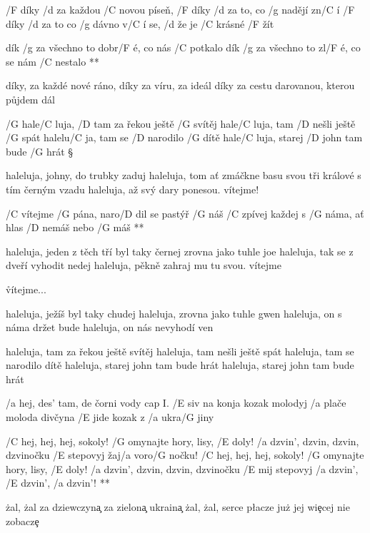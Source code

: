 /F díky /d za každou /C novou píseň, /F díky /d za to, co /g nadějí zn/C í
/F díky /d za to co /g dávno v/C í se, /d že je /C krásné /F žít

\R dík /g za všechno to dobr/F é, co nás /C potkalo
   dík /g za všechno to zl/F é, co se nám /C nestalo **

díky, za každé nové ráno, díky za víru, za ideál
díky za cestu darovanou, kterou půjdem dál





/G hale/C luja, /D tam za řekou ještě /G svítěj
hale/C luja, tam /D nešli ještě /G spát
halelu/C ja, tam se /D narodilo /G dítě
hale/C luja, starej /D john tam bude /G hrát \S

haleluja, johny, do trubky zaduj
haleluja, tom ať zmáčkne basu svou
tři králové s tím černým vzadu
haleluja, až svý dary ponesou. vítejme!

\R  /C vítejme /G pána, naro/D dil se pastýř /G náš
    /C zpívej každej s /G náma, ať hlas /D nemáš nebo /G máš **

haleluja, jeden z těch tří byl taky černej
zrovna jako tuhle joe
haleluja, tak se z dveří vyhodit nedej
haleluja, pěkně zahraj mu tu svou. vítejme

\r vítejme...

haleluja, ježíš byl taky chudej
haleluja, zrovna jako tuhle gwen
haleluja, on s náma držet bude
haleluja, on nás nevyhodí ven

\rr

\rr

haleluja, tam za řekou ještě svítěj
haleluja, tam nešli ještě spát
haleluja, tam se narodilo dítě
haleluja, starej john tam bude hrát
haleluja, starej john tam bude hrát




/a hej, des' tam, de čorni vody \hfill cap I.
/E siv na konja kozak molodyj
/a plače moloda divčyna
/E jide kozak z /a ukra/G jiny

\R  /C hej, hej, hej, sokoly!
    /G omynajte hory, lisy, /E doly!
    /a dzvin', dzvin, dzvin, dzvinočku
    /E stepovyj žaj/a voro/G nočku! \s
    /C hej, hej, hej, sokoly!
    /G omynajte hory, lisy, /E doly!
    /a dzvin', dzvin, dzvin, dzvinočku
    /E mij stepovyj /a dzvin', /E dzvin', /a dzvin'! **

\. zal, \. zal za dziewczyn\c a
za zielon\c a ukrain\c a
\. zal, \. zal, serce p\l acze
ju\. z jej wi\c ecej nie zobacz\c e

